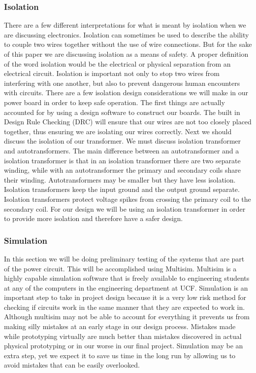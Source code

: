 \subsubsection{Isolation}
There are a few different interpretations for what is meant by isolation when
we are discussing electronics. Isolation can sometimes be used to describe the
ability to couple two wires together without the use of wire connections. But
for the sake of this paper we are discussing isolation as a means of safety. A
proper definition of the word isolation would be the electrical or physical
separation from an electrical circuit. Isolation is important not only to stop
two wires from interfering with one another, but also to prevent dangerous
human encounters with circuits. There are a few isolation design considerations
we will make in our power board in order to keep safe operation. The first
things are actually accounted for by using a design software to construct our
boards. The built in Design Rule Checking (DRC) will ensure that our wires are
not too closely placed together, thus ensuring we are isolating our wires
correctly. Next we should discuss the isolation of our transformer. We must
discuss isolation transformer and  autotransformers. The main difference
between an autotransformer and a isolation transformer is that in an isolation
transformer there are two separate winding, while with an autotransformer the
primary and secondary coils share their winding. Autotransformers may be
smaller but they have less isolation. Isolation transformers keep the input
ground and the output ground separate. Isolation transformers protect voltage
spikes from crossing the primary coil to the secondary coil. For our design we
will be using an isolation transformer in order to provide more isolation and
therefore have a safer
design.\cite{link10}


\subsubsection{Simulation}
In this section we will be doing preliminary testing of the systems that are
part of the power circuit. This will be accomplished using Multisim. Multisim
is a highly capable simulation software that is freely available to engineering
students at any of the computers in the engineering department at UCF.
Simulation is an important step to take in project design because it is a very
low risk method for checking if circuits work in the same manner that they are
expected to work in. Although multisim may not be able to account for
everything it prevents us from making silly mistakes at an early stage in our
design process. Mistakes made while prototyping virtually are much better than
mistakes discovered in actual physical prototyping or in our worse in our final
project. Simulation may be an extra step, yet we expect it to save us time in
the long run by allowing us to avoid mistakes that can be easily overlooked.

